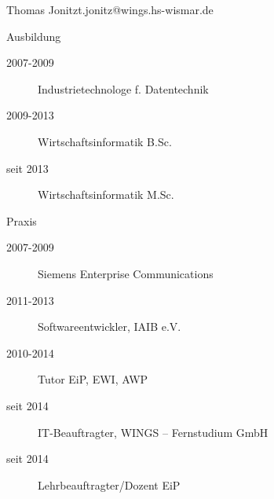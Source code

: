 \documentclass{hswbeamer}
\begin{document}
\begin{frame}[shrink]{Thomas Jonitz}{t.jonitz@wings.hs-wismar.de}
            \begin{block}{Ausbildung}
                \begin{description}
                \item[2007-2009] Industrietechnologe f. Datentechnik
                \item[2009-2013] Wirtschaftsinformatik B.Sc.
                \item[seit 2013] Wirtschaftsinformatik M.Sc.
                \end{description}
            \end{block}
            \begin{block}{Praxis}
                \begin{description}
                \item[2007-2009] Siemens Enterprise Communications
                \item[2011-2013] Softwareentwickler, IAIB e.V.
                \item[2010-2014] Tutor EiP, EWI, AWP
                \item[seit 2014] IT-Beauftragter, WINGS -- Fernstudium GmbH
                \item[seit 2014] Lehrbeauftragter/Dozent EiP
                \end{description}
            \end{block}
\end{frame}
\end{document}

